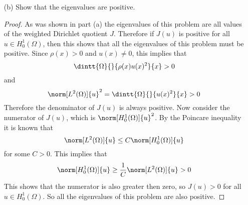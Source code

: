 \documentclass[11pt, oneside]{article}
\begin{document}
\begin{enumerate}
\begin{enumerate}
\begin{proof}
\[          \]
          The condition that this be equal to zero is equivalent to the
          numerator being equal to zero.
          Note that the denominator is strictly positive as $\rho(x)$ is
          strictly positive and $u$ is nonzero.
          The condition can now be simplified to
          \begin{align*}
            2\dintt{\Omega}{}{\rho(x) u(x)^2}{x}\dintt{\Omega}{}{\nabla u \cdot \nabla v}{x} &= 2\dintt{\Omega}{}{\rho(x) u(x)v(x)}{x}\dintt{\Omega}{}{\nabla u \cdot \nabla u}{x} \\
            \dintt{\Omega}{}{\nabla u \cdot \nabla v}{x} &= \frac{\dintt{\Omega}{}{\rho(x) u(x)^2}{x}}{\dintt{\Omega}{}{\nabla u \cdot \nabla u}{x}} \dintt{\Omega}{}{\rho(x) u(x)v(x)}{x} \\
            \dintt{\Omega}{}{\nabla u \cdot \nabla v}{x} &= J(u) \dintt{\Omega}{}{\rho(x) u(x)v(x)}{x} \\
          \end{align*}
          This last statement is exactly the weak formulation of the following PDE
          \[
            -\Delta u = J(u) \rho(x) u
          \]
          This shows that the critical points of $J$ are solutions to the
          eigenvalue problem where $J(u)$ is the eigenvalue.
        \end{proof}

      \item[(b)] %
        Show that the eigenvalues are positive.

        \begin{proof}
          As was shown in part (a) the eigenvalues of this problem are all
          values of the weighted Dirichlet quotient $J$.
          Therefore if $J(u)$ is positive for all $u \in H^1_0(\Omega)$, then
          this shows that all the eigenvalues of this problem must be positive.
          Since $\rho(x) > 0$ and $u(x) \neq 0$, this implies that
          \[
            \dintt{\Omega}{}{\rho(x) u(x)^2}{x} > 0
          \]
          and
          \[
            \norm[L^2(\Omega)]{u}^2 = \dintt{\Omega}{}{u(x)^2}{x} > 0
          \]
          Therefore the denominator of $J(u)$ is always positive.
          Now consider the numerator of $J(u)$, which is $\norm[H^1_0(\Omega)]{u}^2$.
          By the Poincare inequality it is known that
          \[
            \norm[L^2(\Omega)]{u} \le C\norm[H^1_0(\Omega)]{u}
          \]
          for some $C > 0$.
          This implies that
          \[
            \norm[H^1_0(\Omega)]{u} \ge \frac{1}{C} \norm[L^2(\Omega)]{u} > 0
          \]
          This shows that the numerator is also greater then zero, so $J(u) > 0$
          for all $u \in H^1_0(\Omega)$.
          So all the eigenvalues of this problem are also positive.
        \end{proof}


\end{enumerate}
\end{enumerate}
\end{document}
